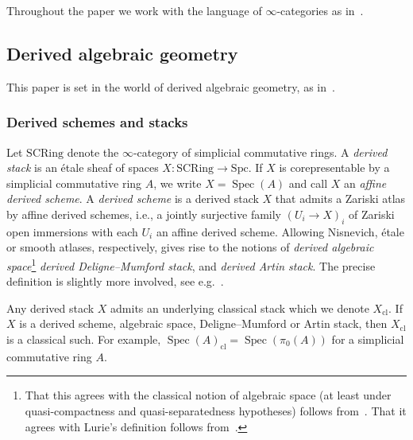 \documentclass[11pt]{article}
\theoremstyle{definition}
\numberwithin{equation}{section}
\numberwithin{figure}{section}
\numberwithin{table}{section}
\newcommand{\Spc}{\mrm{Spc}}
\newcommand{\SCRing}{\mrm{SCRing}}
\newcommand{\cl}{{\mrm{cl}}}
\DeclareMathOperator{\Spec}{Spec}
\newcommand{\mrm}[1]{\ensuremath{\mathrm{#1}}\xspace}
\begin{document}
Throughout the paper we work with the language of $\infty$-categories as in~\cite{HTT,HA-20170918}.

\subsection{Derived algebraic geometry}

This paper is set in the world of derived algebraic geometry, as in~\cite{GaitsgoryRozenblyum,SAG-20180204,HAG2}.

\subsubsection{Derived schemes and stacks}
Let $\SCRing$ denote the $\infty$-category of simplicial commutative rings. A \emph{derived stack} is an étale sheaf of spaces $X : \SCRing \to \Spc$. If $X$ is corepresentable by a simplicial commutative ring $A$, we write $X = \Spec(A)$ and call $X$ an \emph{affine derived scheme}. A \emph{derived scheme} is a derived stack $X$ that admits a Zariski atlas by affine derived schemes, i.e., a jointly surjective family $(U_i \to X)_i$ of Zariski open immersions with each $U_i$ an affine derived scheme. Allowing Nisnevich, étale or smooth atlases, respectively, gives rise to the notions of \emph{derived algebraic space}\footnote{That this agrees with the classical notion of algebraic space (at least under quasi-compactness and quasi-separatedness hypotheses) follows from~\cite[Proposition~5.7.6]{RaynaudGruson}. That it agrees with Lurie's definition follows from~\cite[Example~3.7.1.5]{SAG-20180204}.} \emph{derived Deligne--Mumford stack}, and \emph{derived Artin stack}.
 The precise definition is slightly more involved, see e.g.~\cite[Volume~I, Section~4.1]{GaitsgoryRozenblyum}.

Any derived stack $X$ admits an underlying classical stack which we denote $X_\cl$. If $X$ is a derived scheme, algebraic space, Deligne--Mumford or Artin stack, then $X_\cl$ is a classical such. For example, $\Spec(A)_\cl = \Spec(\pi_0(A))$ for a simplicial commutative ring $A$.
\end{document}
